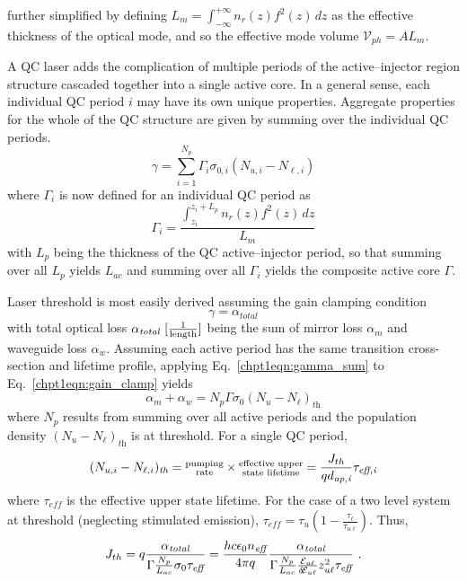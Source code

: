 \documentclass[12pt]{report}
\begin{document}
further simplified by defining $L_m=\int_{-\infty}^{+\infty} \! n_r(z) f^2(z) \, dz$ as the effective thickness of the optical mode, and so the effective mode volume $\mathcal{V}_{ph}=A L_m$.

A QC laser adds the complication of multiple periods of the active--injector region structure cascaded together into a single active core.  In a general sense, each individual QC period $i$ may have its own unique properties.  Aggregate properties for the whole of the QC structure are given by summing over the individual QC periods.
\begin{equation}
\label{chpt1eqn:gamma_sum}
\gamma = \sum_{i=1}^{N_p} \Gamma_i \sigma_{0,i} (N_{u,i}-N_{\ell,i})
\end{equation}
where $\Gamma_i$ is now defined for an individual QC period as
\begin{equation}
\Gamma_i = \frac{\int_{z_i}^{z_i+L_{p}} \! n_r(z) f^2(z) \, dz}{L_m}
\end{equation}
with $L_{p}$ being the thickness of the QC active--injector period, so that summing over all $L_p$ yields $L_{ac}$ and summing over all $\Gamma_i$ yields the composite active core $\Gamma$.

Laser threshold is most easily derived assuming the gain clamping condition
\begin{equation}
\label{chpt1eqn:gain_clamp}
\gamma = \alpha_\textit{total}
\end{equation}
with total optical loss $\alpha_\textit{total}~[\frac{1}{\textnormal{length}}]$ being the sum of mirror loss $\alpha_m$ and waveguide loss $\alpha_w$.  Assuming each active period has the same transition cross-section and lifetime profile, applying Eq.~\eqref{chpt1eqn:gamma_sum} to Eq.~\eqref{chpt1eqn:gain_clamp} yields
\begin{equation}
\alpha_m + \alpha_w = N_p \Gamma \sigma_0 (N_{u}-N_{\ell})_\textit{th}
\end{equation}
where $N_p$ results from summing over all active periods and the population density $(N_{u}-N_{\ell})_\textit{th}$ is at threshold.  For a single QC period,
\begin{equation}
(N_{u,i}-N_{\ell,i})_\textit{th} = \begin{subarray}{c}\textnormal{pumping}\\\textnormal{rate}\end{subarray} \times \begin{subarray}{c}\textnormal{effective upper}\\\textnormal{state lifetime}\end{subarray}
= \frac{J_{th}}{q d_\textit{ap,i}} \tau_\textit{eff,i}
\end{equation}
where $\tau_\textit{eff}$ is the effective upper state lifetime.  For the case of a two level system at threshold (neglecting stimulated emission), $\tau_\textit{eff}=\tau_u \left(1-\frac{\tau_\ell}{\tau_{u\ell}}\right)$.  Thus,
\begin{equation}
J_{th} = q \frac{\alpha_\textit{total}}{ \Gamma \frac{N_p}{L_{ac}} \sigma_0 \tau_\textit{eff}} = \frac{h c \epsilon_0 n_\textit{eff}}{4 \pi q} \frac{\alpha_\textit{total}}{ \Gamma \frac{N_p}{L_{ac}} \frac{\EE_{u\ell}}{\delta\!\EE_{u\ell}} z_{u\ell}^2 \tau_\textit{eff} } \tn{~.}
\end{equation}
\end{document}
